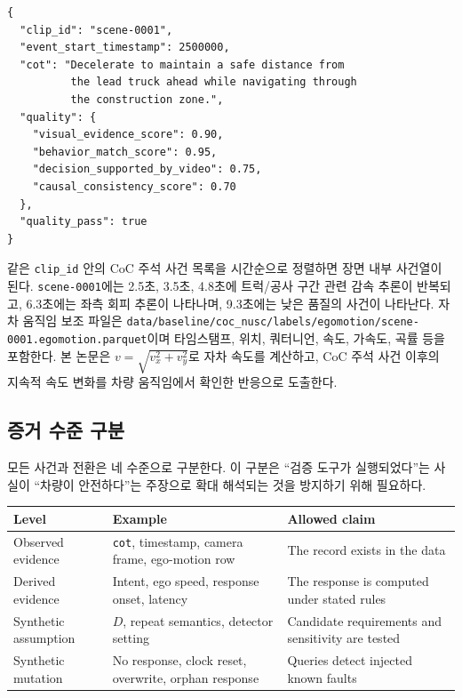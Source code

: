 \noindent\begin{minipage}{\columnwidth}
\begin{lstlisting}[caption={scene-0001의 CoC 사건 레코드 예시. 점수는 모델이 생성한 검증 신호이다.},label={lst:coc-record}]
{
  "clip_id": "scene-0001",
  "event_start_timestamp": 2500000,
  "cot": "Decelerate to maintain a safe distance from
          the lead truck ahead while navigating through
          the construction zone.",
  "quality": {
    "visual_evidence_score": 0.90,
    "behavior_match_score": 0.95,
    "decision_supported_by_video": 0.75,
    "causal_consistency_score": 0.70
  },
  "quality_pass": true
}
\end{lstlisting}
\end{minipage}

같은 \texttt{clip\_id} 안의 CoC 주석 사건 목록을 시간순으로 정렬하면 장면 내부 사건열이 된다. \texttt{scene-0001}에는 2.5초, 3.5초, 4.8초에 트럭/공사 구간 관련 감속 추론이 반복되고, 6.3초에는 좌측 회피 추론이 나타나며, 9.3초에는 낮은 품질의 사건이 나타난다. 자차 움직임 보조 파일은 \texttt{data/baseline/coc\_nusc/labels/egomotion/scene-0001.egomotion.parquet}이며 타임스탬프, 위치, 쿼터니언, 속도, 가속도, 곡률 등을 포함한다. 본 논문은 $v=\sqrt{v_x^2+v_y^2}$로 자차 속도를 계산하고, CoC 주석 사건 이후의 지속적 속도 변화를 차량 움직임에서 확인한 반응으로 도출한다.

\subsection{증거 수준 구분}
모든 사건과 전환은 네 수준으로 구분한다. 이 구분은 ``검증 도구가 실행되었다''는 사실이 ``차량이 안전하다''는 주장으로 확대 해석되는 것을 방지하기 위해 필요하다.

\begin{table}[t]
\centering
{}
\label{tab:evidence-level}
\footnotesize
\begin{tabularx}{\columnwidth}{L{0.24\columnwidth}YY}
\toprule
Level & Example & Allowed claim \\
\midrule
Observed evidence & \texttt{cot}, timestamp, camera frame, ego-motion row & The record exists in the data \\
Derived evidence & Intent, ego speed, response onset, latency & The response is computed under stated rules \\
Synthetic assumption & $D$, repeat semantics, detector setting & Candidate requirements and sensitivity are tested \\
Synthetic mutation & No response, clock reset, overwrite, orphan response & Queries detect injected known faults \\
\bottomrule
\end{tabularx}
\end{table}

